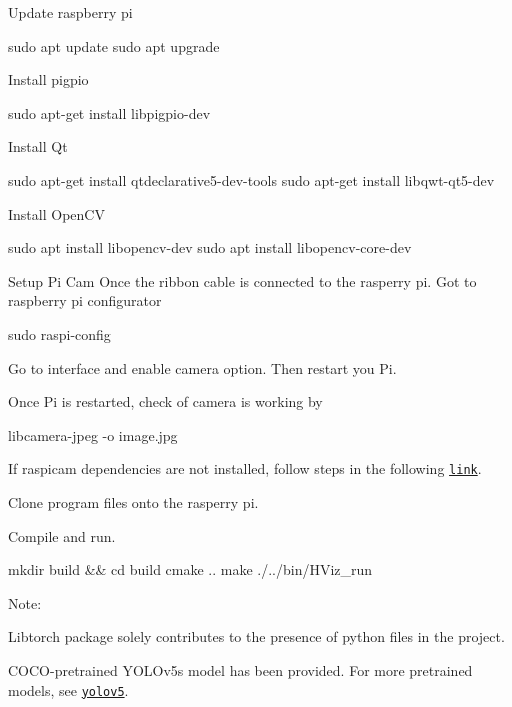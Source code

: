 \begin{DoxyEnumerate}
\item Update raspberry pi 
\begin{DoxyCode}
sudo apt update
sudo apt upgrade
\end{DoxyCode}

\item Install pigpio 
\begin{DoxyCode}
sudo apt-get install libpigpio-dev
\end{DoxyCode}

\item Install Qt 
\begin{DoxyCode}
sudo apt-get install qtdeclarative5-dev-tools
sudo apt-get install libqwt-qt5-dev
\end{DoxyCode}

\item Install Open\+CV 
\begin{DoxyCode}
sudo apt install libopencv-dev
sudo apt install libopencv-core-dev
\end{DoxyCode}

\item Setup Pi Cam Once the ribbon cable is connected to the rasperry pi. Got to raspberry pi configurator 
\begin{DoxyCode}
sudo raspi-config
\end{DoxyCode}

\item Go to interface and enable camera option. Then restart you Pi.
\item Once Pi is restarted, check of camera is working by 
\begin{DoxyCode}
libcamera-jpeg -o image.jpg
\end{DoxyCode}

\item If raspicam dependencies are not installed, follow steps in the following \href{https://github.com/cedricve/raspicam}{\tt link}.
\item Clone program files onto the rasperry pi.
\item Compile and run. 
\begin{DoxyCode}
mkdir build && cd build
cmake ..
make
./../bin/HViz\_run
\end{DoxyCode}

\end{DoxyEnumerate}

Note\+:
\begin{DoxyItemize}
\item Libtorch package solely contributes to the presence of python files in the project.
\item C\+O\+C\+O-\/pretrained Y\+O\+L\+Ov5s model has been provided. For more pretrained models, see \href{https://github.com/ultralytics/yolov5}{\tt yolov5}.
\end{DoxyItemize}

